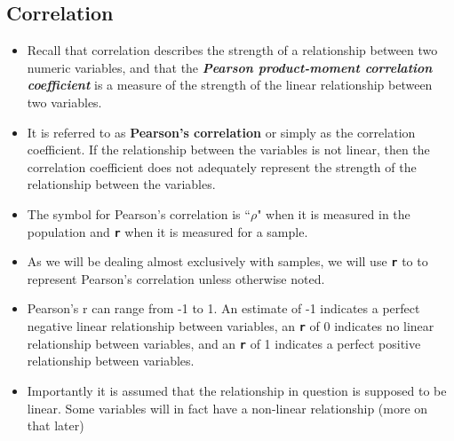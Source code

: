 \documentclass[]{report}
\begin{document}
\subsection*{Correlation}
\begin{itemize}
	\item Recall that correlation describes the strength of a relationship between two numeric variables, and that the \textbf{\textit{Pearson product-moment correlation coefficient}} is a measure of the strength of the linear relationship between two variables.
	
	\item It is referred to as \textbf{Pearson's correlation} or simply as the correlation coefficient. If the relationship between the variables is not linear, then the correlation coefficient does not adequately represent the strength of the relationship between the variables.
	
	\item The symbol for Pearson's correlation is ``$\rho$" when it is measured in the population and \texttt{\textbf{r}} when it is measured for a sample.
	
	\item As we will be dealing almost exclusively with samples, we will use \texttt{\textbf{r}} to to represent Pearson's correlation unless otherwise noted.
	
	\item Pearson's r can range from -1 to 1. An estimate of -1 indicates a perfect negative linear relationship between variables, an \texttt{\textbf{r}} of 0 indicates no linear relationship between variables, and an \texttt{\textbf{r}} of 1 indicates a perfect positive relationship between variables.
	
	\item Importantly it is assumed that the relationship in question is supposed to be linear. Some variables will in fact have a non-linear relationship (more on that later)
\end{itemize}
\end{document}
